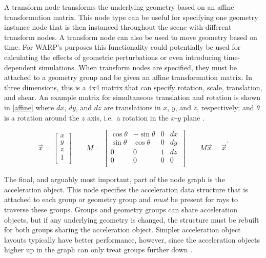 A transform node transforms the underlying geometry based on an affine transformation matrix.  This node type can be useful for specifying one geometry instance node that is then instanced throughout the scene with different transform nodes.  A transform node can also be used to move geometry based on time.  For WARP's purposes this functionality could potentially be used for calculating the effects of geometric perturbations or even introducing time-dependent simulations.  When transform nodes are specified, they must be attached to a geometry group and be given an affine transformation matrix.  In three dimensions, this is a 4x4 matrix that can specify rotation, scale, translation, and shear.  An example matrix for simultaneous translation and rotation is shown in \eqref{affine} where $dx$, $dy$, and $dz$ are translations in $x$, $y$, and $z$, respectively; and $\theta$ is a rotation around the $z$ axis, i.e.\ a rotation in the $x$-$y$ plane \cite{affine}.  

\begin{equation}
\label{affine}
\vec{x} = \left[ \begin{array}{c}
x \\
y\\
z\\
1 \\ \end{array} 
 \right] \qquad
M = \left[ \begin{array}{cccc}
\cos \theta & -\sin \theta & 0 & dx \\
\sin \theta & \cos \theta & 0 &  dy\\
0 & 0 & 1 & dz\\
0 & 0 & 0 & 0\\
\end{array} \right]  \qquad
M \vec{x} = \vec{x}^\prime
\end{equation}

The final, and arguably most important, part of the node graph is the acceleration object.  This node specifies the acceleration data structure that is attached to each group or geometry group and \emph{must} be present for rays to traverse these groups.  Groups and geometry groups can share acceleration objects, but if any underlying geometry is changed, the structure must be rebuilt for both groups sharing the acceleration object.  Simpler acceleration object layouts typically have better performance, however, since the acceleration objects higher up in the graph can only treat groups further down \cite{optix}.

